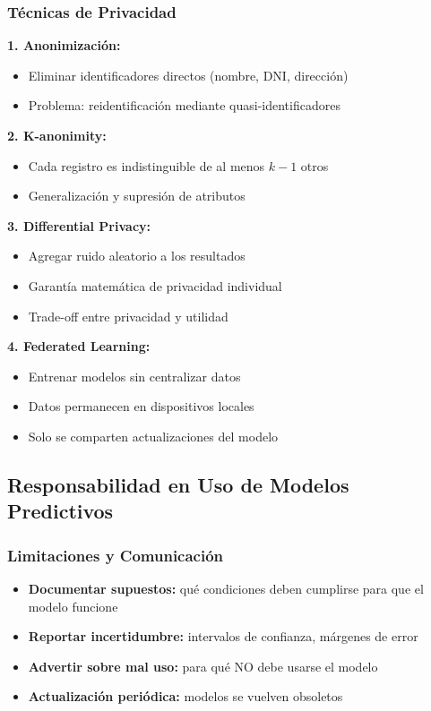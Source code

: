 \documentclass[11pt,a4paper]{article}
\begin{document}
\subsubsection{Técnicas de Privacidad}

\textbf{1. Anonimización:}
\begin{itemize}
\item Eliminar identificadores directos (nombre, DNI, dirección)
\item Problema: reidentificación mediante quasi-identificadores
\end{itemize}

\textbf{2. K-anonimity:}
\begin{itemize}
\item Cada registro es indistinguible de al menos $k-1$ otros
\item Generalización y supresión de atributos
\end{itemize}

\textbf{3. Differential Privacy:}
\begin{itemize}
\item Agregar ruido aleatorio a los resultados
\item Garantía matemática de privacidad individual
\item Trade-off entre privacidad y utilidad
\end{itemize}

\textbf{4. Federated Learning:}
\begin{itemize}
\item Entrenar modelos sin centralizar datos
\item Datos permanecen en dispositivos locales
\item Solo se comparten actualizaciones del modelo
\end{itemize}

\subsection{Responsabilidad en Uso de Modelos Predictivos}

\subsubsection{Limitaciones y Comunicación}

\begin{itemize}
\item \textbf{Documentar supuestos:} qué condiciones deben cumplirse para que el modelo funcione
\item \textbf{Reportar incertidumbre:} intervalos de confianza, márgenes de error
\item \textbf{Advertir sobre mal uso:} para qué NO debe usarse el modelo
\item \textbf{Actualización periódica:} modelos se vuelven obsoletos
\end{itemize}
\end{document}
